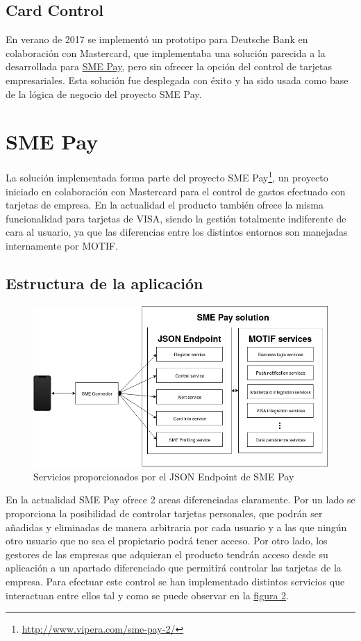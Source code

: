 \documentclass[a4paper, 12pt]{article}
\begin{document}
\subsection{Card Control}
\label{sec-2-4}
En verano de 2017 se implementó un prototipo para Deutsche Bank en colaboración con Mastercard, que implementaba una solución parecida
a la desarrollada para \hyperref[sec:smepay]{SME Pay}, pero sin ofrecer la opción del control de tarjetas empresariales. Esta solución fue desplegada con éxito
y ha sido usada como base de la lógica de negocio del proyecto SME Pay.
\section{SME Pay}
\label{sec-3}
\label{sec:smepay}
La solución implementada forma parte del proyecto SME Pay\footnote{\url{http://www.vipera.com/sme-pay-2/}}, un proyecto iniciado en colaboración con Mastercard para el control
de gastos efectuado con tarjetas de empresa. En la actualidad el producto también ofrece la misma funcionalidad para tarjetas de VISA,
siendo la gestión totalmente indiferente de cara al usuario, ya que las diferencias entre los distintos entornos son manejadas internamente
por MOTIF.
\subsection{Estructura de la aplicación}
\label{sec-3-1}
\begin{figure}[htb]
\centering
\includegraphics[width=.9\linewidth]{./images/smepay.png}
\caption{\label{fig:sme-services}Servicios proporcionados por el JSON Endpoint de SME Pay}
\end{figure}
En la actualidad SME Pay ofrece 2 areas diferenciadas claramente. Por un lado se proporciona la posibilidad de controlar tarjetas personales,
que podrán ser añadidas y eliminadas de manera arbitraria por cada usuario y a las que ningún otro usuario que no sea el propietario podrá tener
acceso. Por otro lado, los gestores de las empresas que adquieran el producto tendrán acceso desde su aplicación a un apartado diferenciado que
permitirá controlar las tarjetas de la empresa. Para efectuar este control se han implementado distintos servicios que interactuan entre ellos
tal y como se puede observar en la \hyperref[fig:sme-services]{figura 2}.
\end{document}
